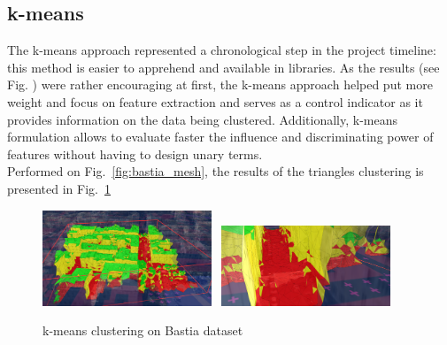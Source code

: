 \documentclass{kththesis}
\begin{document}
\subsection{k-means}
The k-means approach represented a chronological step in the project timeline: this method is easier to apprehend and available in libraries. As the results (see Fig. ) were rather encouraging at first, the k-means approach helped put more weight and focus on feature extraction and serves as a control indicator as it provides information on the data being clustered. Additionally, k-means formulation allows to evaluate faster the influence and discriminating power of features without having to design unary terms. \\
Performed on Fig.~\ref{fig:bastia_mesh}, the results of the triangles clustering is presented in Fig.~\ref{fig:k-means_bastia}
\begin{figure}[H]
    \centering
    \includegraphics[width=0.45\textwidth]{images/Results/lod17_rouhani.png}~
    \includegraphics[width=0.45\textwidth]{images/Results/lod17_rouhani_otherview.png}
    \caption{k-means clustering on Bastia dataset}
    \label{fig:k-means_bastia}
\end{figure}
\end{document}
